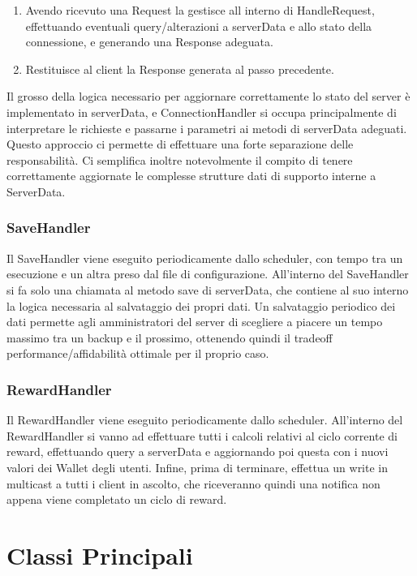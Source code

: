 \documentclass[11pt]{article}
\begin{document}
\begin{flushleft}
\begin{enumerate}
\item Avendo ricevuto una Request la gestisce all interno di HandleRequest, effettuando eventuali query/alterazioni a serverData e allo stato della connessione, e generando una Response adeguata.

\item Restituisce al client la Response generata al passo precedente.

\end{enumerate}

Il grosso della logica necessario per aggiornare correttamente lo stato del server è implementato in serverData, e ConnectionHandler si occupa principalmente di interpretare le richieste e passarne i parametri ai metodi di serverData adeguati.
Questo approccio ci permette di effettuare una forte separazione delle responsabilità. Ci semplifica inoltre notevolmente il compito di tenere correttamente aggiornate le complesse strutture dati di supporto interne a ServerData.

\subsubsection{SaveHandler}

Il SaveHandler viene eseguito periodicamente dallo scheduler, con tempo tra un esecuzione e un altra preso dal file di configurazione.
All'interno del SaveHandler si fa solo una chiamata al metodo save di serverData, che contiene al suo interno la logica necessaria al salvataggio dei propri dati.
Un salvataggio periodico dei dati permette agli amministratori del server di scegliere a piacere un tempo massimo tra un backup e il prossimo, ottenendo quindi il tradeoff performance/affidabilità ottimale per il proprio caso.


\subsubsection{RewardHandler}

Il RewardHandler viene eseguito periodicamente dallo scheduler.
All'interno del RewardHandler si vanno ad effettuare tutti i calcoli relativi al ciclo corrente di reward, effettuando query a serverData e aggiornando poi questa con i nuovi valori dei Wallet degli utenti.
Infine, prima di terminare, effettua un write in multicast a tutti i client in ascolto, che riceveranno quindi una notifica non appena viene completato un ciclo di reward.

\break

\section{Classi Principali}


\end{flushleft}
\end{document}
